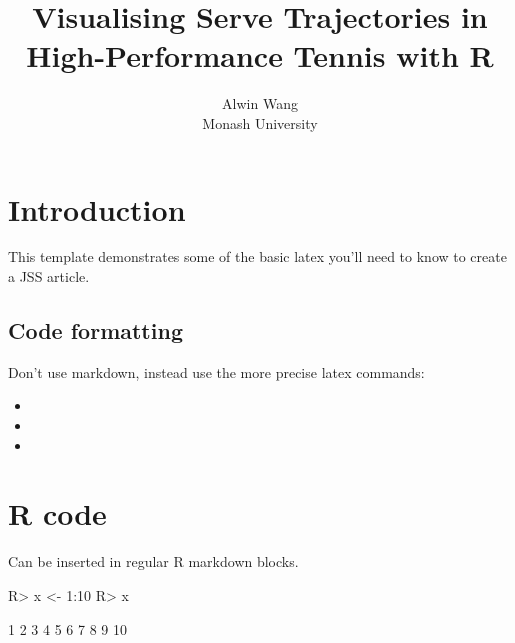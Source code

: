 \documentclass[article]{jss}
\author{
Alwin Wang\\Monash University
}
\title{Visualising Serve Trajectories in High-Performance Tennis with R}
\providecommand{\tightlist}{%
  \setlength{\itemsep}{0pt}\setlength{\parskip}{0pt}}
\begin{document}
\section{Introduction}\label{introduction}

This template demonstrates some of the basic latex you'll need to know
to create a JSS article.

\subsection{Code formatting}\label{code-formatting}

Don't use markdown, instead use the more precise latex commands:

\begin{itemize}
\tightlist
\item
\item
\item
\end{itemize}

\section{R code}\label{r-code}

Can be inserted in regular R markdown blocks.

\begin{CodeChunk}
\begin{CodeInput}
R> x <- 1:10
R> x
\end{CodeInput}
\begin{CodeOutput}
 [1]  1  2  3  4  5  6  7  8  9 10
\end{CodeOutput}
\end{CodeChunk}
\end{document}
